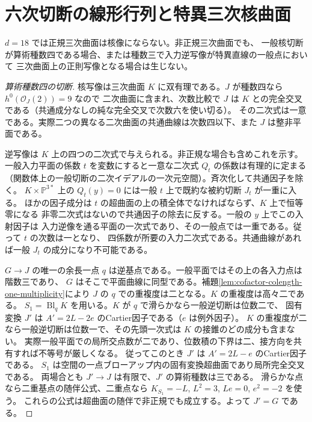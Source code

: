 \section{六次切断の線形行列と特異三次核曲面}
\label{sec:cofactor-eighteen-cubic-incidence}
\begin{theorem}\label{thm:cofactor-eighteen-normal-cubic}
$d=18$ では正規三次曲面は核像にならない。非正規三次曲面でも、
一般核切断が算術種数四である場合、または種数三で入力逆写像が特異直線の一般点において
三次曲面上の正則写像となる場合は生じない。
\end{theorem}
\begin{proof}[算術種数四の切断]
核写像は三次曲面 $K$ に双有理である。$J$ が種数四なら $h^0(\mathcal O_J(2))=9$ なので
二次曲面に含まれ、次数比較で $J$ は $K$ との完全交叉である（共通成分なしの純な完全交叉で次数六を使い切る）。
その二次式は一意である。実際二つの異なる二次曲面の共通曲線は次数四以下、また $J$ は整非平面である。

逆写像は $K$ 上の四つの二次式で与えられる。非正規な場合も含めこれを示す。
一般入力平面の係数 $t$ を変数にすると一意な二次式 $Q_t$ の係数は有理的に定まる
（関数体上の一般切断の二次イデアルの一次元空間）。斉次化して共通因子を除く。
$K\times\mathbb P^{3*}$ 上の $Q_t(y)=0$ には一般 $t$ 上で既約な被約切断 $J_t$ が一重に入る。
ほかの因子成分は $t$ の超曲面の上の積全体でなければならず、$K$ 上で恒等零になる
非零二次式はないので共通因子の除去に反する。一般の $y$ 上でこの入射因子は
入力逆像を通る平面の一次式であり、その一般点では一重である。従って $t$ の次数は一となり、
四係数が所要の入力二次式である。共通曲線があれば一般 $J_t$ の成分になり不可能である。

$G\to J$ の唯一の余長一点 $q$ は逆基点である。一般平面ではその上の各入力点は階数三であり、
$G$ はそこで平面曲線に同型である。補題\ref{lem:cofactor-colength-one-multiplicity}により
$J$ の $q$ での重複度は二となる。$K$ の重複度は高々二である。
$S_1=\operatorname{Bl}_q K$ を用いる。$K$ が $q$ で滑らかなら一般逆切断は位数二で、
固有変換 $J'$ は $A'=2L-2e$ のCartier因子である（$e$ は例外因子）。
$K$ の重複度が二なら一般逆切断は位数一で、その先頭一次式は $K$ の接錐のどの成分も含まない。
実際一般平面での局所交点数が二であり、位数積の下界は二、接方向を共有すれば不等号が厳しくなる。
従ってこのとき $J'$ は $A'=2L-e$ のCartier因子である。
$S_1$ は空間の一点ブローアップ内の固有変換超曲面であり局所完全交叉である。
両場合とも $J'\to J$ は有限で、$J'$ の算術種数は三である。
滑らかな点なら二重基点の随伴公式、二重点なら $K_{S_1}=-L$, $L^2=3$, $Le=0$, $e^2=-2$ を使う。
これらの公式は超曲面の随伴で非正規でも成立する。よって $J'=G$ である。


\end{proof}
